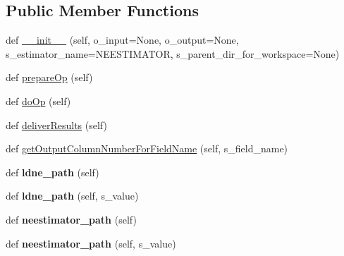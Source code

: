 \subsection*{Public Member Functions}
\begin{DoxyCompactItemize}
\item 
def \hyperlink{classnegui_1_1pgopneestimator_1_1PGOpNeEstimator_afa820d0b45ef47e2fd9b5dbbc3978375}{\+\_\+\+\_\+init\+\_\+\+\_\+} (self, o\+\_\+input=None, o\+\_\+output=None, s\+\_\+estimator\+\_\+name=N\+E\+E\+S\+T\+I\+M\+A\+T\+OR, s\+\_\+parent\+\_\+dir\+\_\+for\+\_\+workspace=None)
\item 
def \hyperlink{classnegui_1_1pgopneestimator_1_1PGOpNeEstimator_a37628c8a837a75a542ae82947dc367fd}{prepare\+Op} (self)
\item 
def \hyperlink{classnegui_1_1pgopneestimator_1_1PGOpNeEstimator_a08032c5f1aec98e9da5b258287e67bcc}{do\+Op} (self)
\item 
def \hyperlink{classnegui_1_1pgopneestimator_1_1PGOpNeEstimator_ad20919b3cfce1fae03d64ae2aa19981f}{deliver\+Results} (self)
\item 
def \hyperlink{classnegui_1_1pgopneestimator_1_1PGOpNeEstimator_a34594cb054d2b281775aa080eec7caa5}{get\+Output\+Column\+Number\+For\+Field\+Name} (self, s\+\_\+field\+\_\+name)
\item 
def {\bfseries ldne\+\_\+path} (self)\hypertarget{classnegui_1_1pgopneestimator_1_1PGOpNeEstimator_a12a6709fe65b29ec5fbf022667f64671}{}\label{classnegui_1_1pgopneestimator_1_1PGOpNeEstimator_a12a6709fe65b29ec5fbf022667f64671}

\item 
def {\bfseries ldne\+\_\+path} (self, s\+\_\+value)\hypertarget{classnegui_1_1pgopneestimator_1_1PGOpNeEstimator_aae78d9adba5ab40a6483fcc41ff804c9}{}\label{classnegui_1_1pgopneestimator_1_1PGOpNeEstimator_aae78d9adba5ab40a6483fcc41ff804c9}

\item 
def {\bfseries neestimator\+\_\+path} (self)\hypertarget{classnegui_1_1pgopneestimator_1_1PGOpNeEstimator_a4ea2e58f1bdc996c503d510af6105671}{}\label{classnegui_1_1pgopneestimator_1_1PGOpNeEstimator_a4ea2e58f1bdc996c503d510af6105671}

\item 
def {\bfseries neestimator\+\_\+path} (self, s\+\_\+value)\hypertarget{classnegui_1_1pgopneestimator_1_1PGOpNeEstimator_ad24778e5b8ec1da97f140a9d6cb04226}{}\label{classnegui_1_1pgopneestimator_1_1PGOpNeEstimator_ad24778e5b8ec1da97f140a9d6cb04226}

\end{DoxyCompactItemize}


